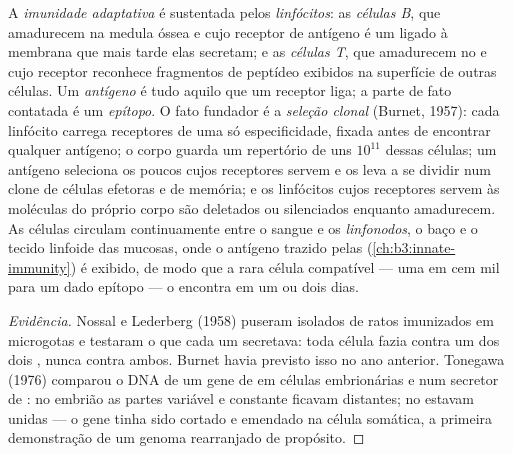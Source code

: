 \begin{definition}\label{def:b3:adaptive-immunity:lymphocytes}
A \emph{imunidade adaptativa} é sustentada pelos \emph{linfócitos}: as
\emph{células B}, que amadurecem na medula óssea e cujo receptor de
antígeno é um \emph{} ligado à membrana que mais tarde elas
secretam; e as \emph{células T}, que amadurecem no  e cujo receptor
reconhece fragmentos de peptídeo exibidos na superfície de outras
células. Um \emph{antígeno} é tudo aquilo que um receptor liga; a parte
de fato contatada é um \emph{epítopo}. O fato fundador é a \emph{seleção
clonal} (Burnet, 1957): cada linfócito carrega receptores de uma só
especificidade, fixada antes de encontrar qualquer antígeno; o corpo
guarda um repertório de uns $10^{11}$ dessas células; um antígeno
seleciona os poucos cujos receptores servem e os leva a se dividir num
clone de células efetoras e de memória; e os linfócitos cujos
receptores servem às moléculas do próprio corpo são deletados ou
silenciados enquanto amadurecem. As células circulam continuamente
entre o sangue e os \emph{linfonodos}, o baço e o tecido linfoide das
mucosas, onde o antígeno trazido pelas 
(\cref{ch:b3:innate-immunity}) é exibido, de modo que a rara célula
compatível --- uma em cem mil para um dado epítopo --- o encontra em um
ou dois dias.
\end{definition}

\begin{proof}[Evidência]
Nossal e Lederberg (1958) puseram  isolados de ratos
imunizados em microgotas e testaram o  que cada um secretava:
toda célula fazia  contra um dos dois , nunca contra
ambos. Burnet havia previsto isso no ano anterior. Tonegawa (1976)
comparou o DNA de um gene de  em células embrionárias e num
 secretor de : no embrião as partes variável e constante
ficavam distantes; no  estavam unidas --- o gene tinha sido
cortado e emendado na célula somática, a primeira demonstração de um
genoma rearranjado de propósito.
\end{proof}

